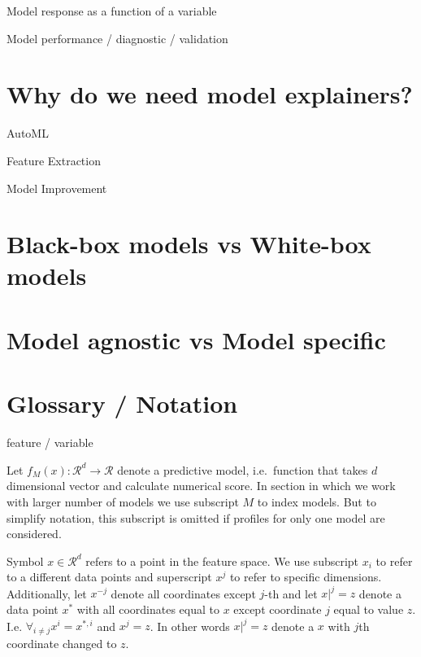 \documentclass[]{book}
\theoremstyle{definition}
\theoremstyle{definition}
\theoremstyle{definition}
\theoremstyle{remark}
\begin{document}
Model response as a function of a variable

Model performance / diagnostic / validation

\hypertarget{why-do-we-need-model-explainers}{%
\section{Why do we need model
explainers?}\label{why-do-we-need-model-explainers}}

AutoML

Feature Extraction

Model Improvement

\hypertarget{black-box-models-vs-white-box-models}{%
\section{Black-box models vs White-box
models}\label{black-box-models-vs-white-box-models}}

\citep{R-DALEX}

\hypertarget{model-agnostic-vs-model-specific}{%
\section{Model agnostic vs Model
specific}\label{model-agnostic-vs-model-specific}}

\hypertarget{glossary-notation}{%
\section{Glossary / Notation}\label{glossary-notation}}

feature / variable

Let \(f_{M}(x): \mathcal R^{d} \rightarrow \mathcal R\) denote a
predictive model, i.e.~function that takes \(d\) dimensional vector and
calculate numerical score. In section in which we work with larger
number of models we use subscript \(M\) to index models. But to simplify
notation, this subscript is omitted if profiles for only one model are
considered.

Symbol \(x \in \mathcal R^d\) refers to a point in the feature space. We
use subscript \(x_i\) to refer to a different data points and
superscript \(x^j\) to refer to specific dimensions. Additionally, let
\(x^{-j}\) denote all coordinates except \(j\)-th and let \(x|^j=z\)
denote a data point \(x^*\) with all coordinates equal to \(x\) except
coordinate \(j\) equal to value \(z\). I.e.
\(\forall_{i \neq {j}} x^i = x^{*,i}\) and \(x^j = z\). In other words
\(x|^j=z\) denote a \(x\) with \(j\)th coordinate changed to \(z\).
\end{document}
